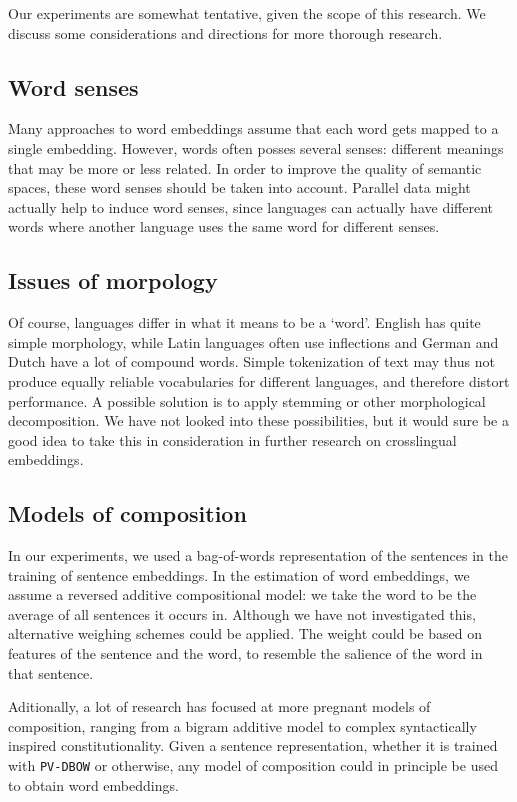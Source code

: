 
Our experiments are somewhat tentative, given the scope of this research. We discuss some considerations and directions for more thorough research.

\subsection{Word senses}
Many approaches to word embeddings assume that each word gets mapped to a single embedding. However, words often posses several senses: different meanings that may be more or less related. In order to improve the quality of semantic spaces, these word senses should be taken into account. Parallel data might actually help to induce word senses, since languages can actually have different words where another language uses the same word for different senses.

\subsection{Issues of morpology}
Of course, languages differ in what it means to be a `word'. English has quite simple morphology, while Latin languages often use inflections and German and Dutch have a lot of compound words. Simple tokenization of text may thus not produce equally reliable vocabularies for different languages, and therefore distort performance. A possible solution is to apply stemming or other morphological decomposition. We have not looked into these possibilities, but it would sure be a good idea to take this in consideration in further research on crosslingual embeddings.

\subsection{Models of composition}
In our experiments, we used a bag-of-words representation of the sentences in the training of sentence embeddings. In the estimation of word embeddings, we assume a reversed additive compositional model: we take the word to be the average of all sentences it occurs in. Although we have not investigated this, alternative weighing schemes could be applied. The weight could be based on features of the sentence and the word, to resemble the salience of the word in that sentence.

Aditionally, a lot of research has focused at more pregnant models of composition, ranging from a bigram additive model \cite{hermann2014multilingual} to complex syntactically inspired constitutionality. Given a sentence representation, whether it is trained with {\tt PV-DBOW} or otherwise, any model of composition could in principle be used to obtain word embeddings.